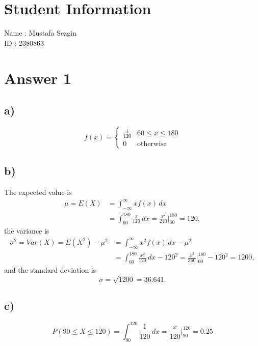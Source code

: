 \documentclass[12pt]{article}
\begin{document}
\section*{Student Information}

Name : Mustafa Sezgin \\

ID : 2380863 \\


\section*{Answer 1}
\subsection*{a)}
\[
    f(x) =
    \begin{cases}
        \frac{1}{120} & 60 \leq x \leq 180 \\
        0 & \text{otherwise}
    \end{cases}
\]

\subsection*{b)}
\noindent The expected value is
\begin{align*}
    \mu = E(X)
    &= \int_{-\infty}^{\infty} x f(x) \, dx \\
    &= \int_{60}^{180} \frac{x}{120} \, dx
    = \frac{x^2}{240} \bigg|_{60}^{180}
    = 120,
\end{align*}
the variance is
\begin{align*}
    \sigma^2 = Var(X)
    = E(X^2) - \mu^2
    &= \int_{-\infty}^{\infty} x^2 f(x) \, dx - \mu^2 \\
    &= \int_{60}^{180} \frac{x^2}{120} \, dx - 120^2
    = \frac{x^3}{360} \bigg|_{60}^{180} - 120^2
    = 1200,
\end{align*}
and the standard deviation is
\[
    \sigma = \sqrt{1200} = 36.641.
\]

\subsection*{c)}
\[
    P(90 \leq X \leq 120) = \int_{90}^{120} \frac{1}{120} \, dx
    = \frac{x}{120} \bigg|_{90}^{120}
    = 0.25
\]
\end{document}
